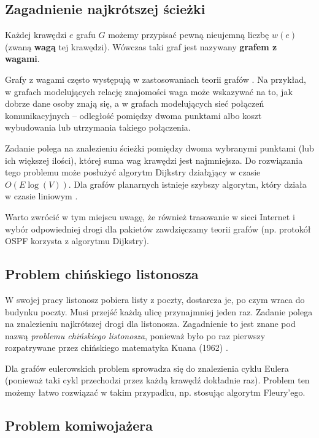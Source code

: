 \subsection*{Zagadnienie najkrótszej ścieżki}

Każdej krawędzi $e$ grafu $G$ możemy przypisać pewną nieujemną liczbę $w(e)$ (zwaną \textbf{wagą} tej krawędzi). Wówczas taki graf jest nazywany \textbf{grafem z wagami}. 

Grafy z wagami często występują w zastosowaniach teorii grafów \cite{bondy}. Na przykład, w grafach modelujących relację znajomości waga może wskazywać na to, jak dobrze dane osoby znają się, a w grafach modelujących sieć połączeń komunikacyjnych -- odległość pomiędzy dwoma punktami albo koszt wybudowania lub utrzymania takiego połączenia. 

Zadanie polega na znalezieniu ścieżki pomiędzy dwoma wybranymi punktami (lub ich większej ilości), której suma wag krawędzi jest najmniejsza. Do rozwiązania tego problemu może posłużyć algorytm Dijkstry działąjący w czasie $O(E\log(V))$. Dla grafów planarnych istnieje szybszy algorytm, który działa w czasie liniowym \cite{henzinger}. 

Warto zwrócić w tym miejscu uwagę, że również trasowanie w sieci Internet i wybór odpowiedniej drogi dla pakietów zawdzięczamy teorii grafów (np. protokół OSPF korzysta z algorytmu Dijkstry). 


\subsection*{Problem chińskiego listonosza}

W swojej pracy listonosz pobiera listy z poczty, dostarcza je, po czym wraca do budynku poczty. Musi przejść każdą ulicę przynajmniej jeden raz. Zadanie polega na znalezieniu najkrótszej drogi dla listonosza. Zagadnienie to jest znane pod nazwą \emph{problemu chińskiego listonosza}, ponieważ było po raz pierwszy rozpatrywane przez chińskiego matematyka Kuana (1962) \cite[62]{bondy}. 

Dla grafów eulerowskich problem sprowadza się do znalezienia cyklu Eulera (ponieważ taki cykl przechodzi przez każdą krawędź dokładnie raz). Problem ten możemy łatwo rozwiązać w takim przypadku, np. stosując algorytm Fleury'ego. 


\subsection*{Problem komiwojażera}

